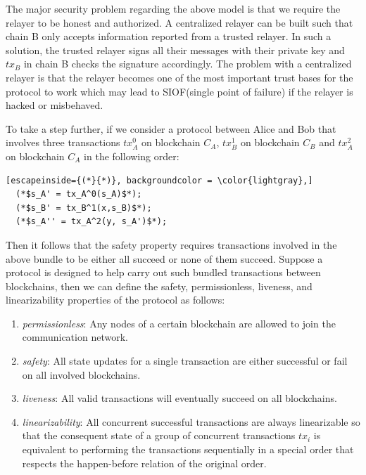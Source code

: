 \documentclass[pageno]{jpaper}
\begin{document}
The major security problem regarding the above model is that we require the relayer to be honest and authorized. A centralized relayer can be built such that chain B only accepts information reported from a trusted relayer. In such a solution, the trusted relayer signs all their messages with their private key and $tx_B$ in chain B checks the signature accordingly. The problem with a centralized relayer is that the relayer becomes one of the most important trust bases for the protocol to work which may lead to SIOF(single point of failure) if the relayer is hacked or misbehaved.

To take a step further, if we consider a protocol between Alice and Bob that involves three transactions $tx_A^0$ on blockchain $C_A$, $tx_B^1$ on blockchain $C_B$ and $tx_A^2$ on blockchain $C_A$ in the following order:
\begin{lstlisting}[escapeinside={(*}{*)}, backgroundcolor = \color{lightgray},]
  (*$s_A' = tx_A^0(s_A)$*);
  (*$s_B' = tx_B^1(x,s_B)$*);
  (*$s_A'' = tx_A^2(y, s_A')$*);
\end{lstlisting}
Then it follows that the safety property requires transactions involved in the above bundle to be either all succeed or none of them succeed. Suppose a protocol is designed to help carry out such bundled transactions between blockchains, then we can define the safety, permissionless, liveness, and linearizability properties of the protocol as follows:

\begin{enumerate}[leftmargin=*]
\item {\it permissionless}: Any nodes of a certain blockchain are allowed to join the communication network.
\item {\it safety}: All state updates for a single transaction are either successful or fail on all involved blockchains.
\item {\it liveness}: All valid transactions will eventually succeed on all blockchains.
\item {\it linearizability}: All concurrent successful transactions are always linearizable so that the consequent state of a group of concurrent transactions $tx_i$ is equivalent to performing the transactions sequentially in a special order that respects the happen-before relation of the original order.
\end{enumerate}
\end{document}
